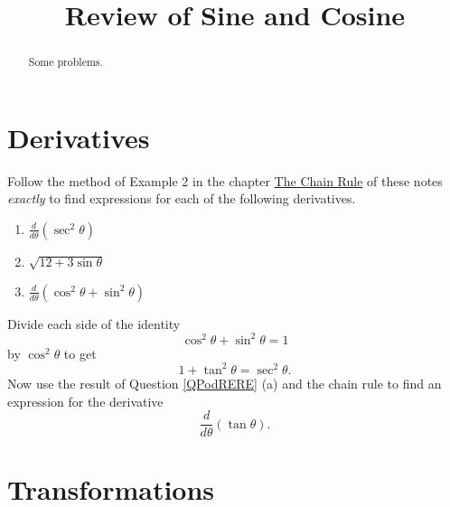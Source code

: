 \documentclass{ximera}
\title{Review of Sine and Cosine}
\begin{document}
\begin{abstract}
Some problems.
\end{abstract}
\maketitle


\section{Derivatives}

\begin{question} \label{QPodRERE}

Follow the method of Example 2 in the chapter \href{https://ximera.osu.edu/calcone2025master/Calculus1/ChainRule/ChainRule}{The Chain Rule} of these notes \emph{exactly} to find expressions for each of the following derivatives.

\begin{enumerate}
\item  $\frac{d}{d\theta}\left(  \sec^2\theta \right)$

\item $\sqrt{12 + 3\sin\theta}$

\item $\frac{d}{d\theta} \left( \cos^2\theta + \sin^2\theta  \right)$

\end{enumerate}

\end{question}


\begin{question} \label{QKDFL43rr4r}
Divide each side of the identity
\[
  \cos^2\theta + \sin^2\theta = 1
\]
by $\cos^2\theta$ to get
\[
  1 + \tan^2\theta = \sec^2\theta.
\]
Now use the result of Question \ref{QPodRERE} (a) and the chain rule to find an expression for the derivative
\[
    \frac{d}{d\theta} \left(  \tan\theta \right) .
\]
\end{question}




\section{Transformations}
\end{document}
